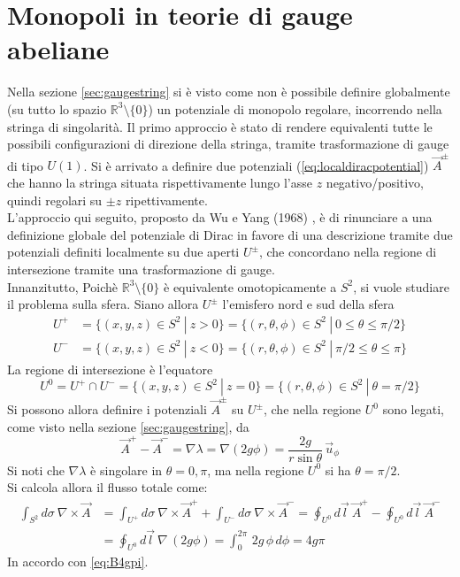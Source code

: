 \chapter{Monopoli in teorie di gauge abeliane}
Nella sezione \ref{sec:gaugestring} si è visto come non è possibile definire globalmente
(su tutto lo spazio $\mathbb{R}^3 \setminus \{0\}$) un potenziale di monopolo regolare,
incorrendo nella stringa di singolarità. Il primo approccio è stato di rendere
equivalenti tutte le possibili configurazioni di direzione della stringa, tramite
trasformazione di gauge di tipo $U(1)$. Si è arrivato a definire due potenziali
(\ref{eq:localdiracpotential}) $\vec A ^\pm$ che hanno la stringa situata rispettivamente
lungo l'asse $z$ negativo/positivo, quindi regolari su $\pm z$ ripettivamente.\\
L'approccio qui seguito, proposto da Wu e Yang (1968) \cite{wuyang}, è di
rinunciare a una definizione globale del potenziale di Dirac
in favore di una descrizione tramite due potenziali definiti localmente su due aperti
$U^\pm$, che concordano nella regione di intersezione tramite una trasformazione
di gauge.\\

Innanzitutto, Poichè $\mathbb{R}^3 \setminus \{0\}$ è equivalente omotopicamente
a $S^2$, si vuole studiare il problema sulla sfera. Siano allora $U^\pm$ l'emisfero
nord e sud della sfera
\begin{equation*}
   \begin{aligned}
      U^+ &= \{(x,y,z) \in S^2 \: | \: z > 0 \}
          = \{(r,\theta,\phi) \in S^2 \: | \: 0 \leq \theta \leq \pi/2 \} \\
      U^- &= \{(x,y,z) \in S^2 \: | \: z < 0 \}
          = \{(r,\theta,\phi) \in S^2 \: | \: \pi/2 \leq \theta \leq \pi \}
   \end{aligned}
\end{equation*}
La regione di intersezione è l'equatore
$$
   U^0 = U^+ \cap U^- = \{(x,y,z) \in S^2 \: | \: z = 0 \}
       = \{(r,\theta,\phi) \in S^2 \: | \: \theta = \pi/2 \}
$$
Si possono allora definire i potenziali $\vec A^\pm$ su $U^\pm$, che nella regione
$U^0$ sono legati, come visto nella sezione \ref{sec:gaugestring}, da
$$
   \vec A ^+ - \vec A^- = \nabla \lambda = \nabla (2g\phi) = \frac{2g}{r\sin\theta} \, \vec u _\phi
$$
Si noti che $\nabla \lambda$ è singolare in $\theta = 0,\pi$, ma nella regione $U^0$
si ha $\theta = \pi/2$.\\
Si calcola allora il flusso totale come:
\begin{equation*}
   \begin{aligned}
      \int_{S^2} d\sigma \: \nabla \times \vec A & =
         \int_{U^+} d\sigma \: \nabla \times \vec A^+ +
         \int_{U^-} d\sigma \: \nabla \times \vec A^-
        = \oint_{U^0} d\vec l \: \vec A^+ -
          \oint_{U^0} d\vec l \: \vec A^- \\
      & = \oint_{U^0} d\vec l \: \nabla \, (2g\phi)
        = \int_0^{2\pi} \, 2g \, \phi \, d\phi
        = 4g\pi
   \end{aligned}
\end{equation*}
In accordo con \ref{eq:B4gpi}.\\

